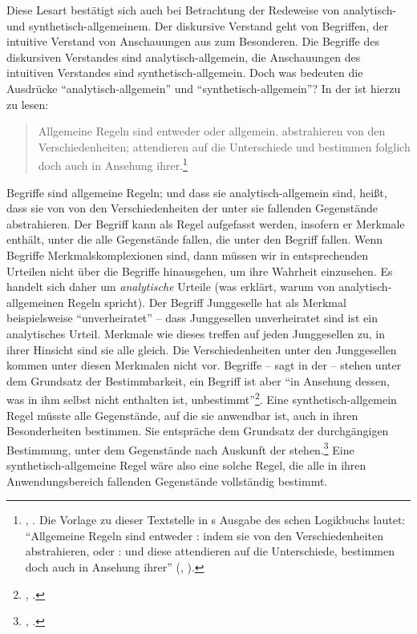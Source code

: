 Diese Lesart bestätigt sich auch  bei Betrachtung der Redeweise von analytisch-
und synthetisch-allgemeinem. Der diskursive Verstand geht von Begriffen, der
intuitive Verstand von Anschauungen aus zum Besonderen. Die Begriffe des
diskursiven Verstandes sind analytisch-allgemein, die Anschauungen des
intuitiven Verstandes sind synthetisch-allgemein. Doch was bedeuten die
Ausdrücke \enquote{ana\-ly\-tisch-all\-ge\-mein} und
\enquote{syn\-the\-tisch-all\-ge\-mein}? In der {\jaeschelogik} ist hierzu zu lesen:
\begin{quote}
Allgemeine Regeln sind entweder  oder 
allgemein.  abstrahieren von den Verschiedenheiten; 
attendieren auf die Unterschiede und bestimmen folglich doch auch in Ansehung
ihrer.\footnote{\cite[][\S~21]{Kant:ImmanuelKantsLogik1977},
\cite[][IX: 102.31--33]{Kant:GesammelteWerke1900ff.}. Die Vorlage zu dieser
Textstelle in s Ausgabe des
schen Logikbuchs lautet:
\enquote{Allgemeine Regeln sind entweder
: indem sie von den Verschiedenheiten
abstrahieren, oder : und diese attendieren
auf die Unterschiede, bestimmen doch auch in Ansehung ihrer}
\mkbibparens{\cite[][]{Kant:Reflexionen1900ff.},
\cite[][XVI: 651.5--8]{Kant:GesammelteWerke1900ff.}}.}
\end{quote}
Begriffe sind allgemeine Regeln; und dass sie analytisch-allgemein sind, heißt,
dass sie von von den Verschiedenheiten der unter sie fallenden Gegenstände
abstrahieren. Der Begriff kann als Regel aufgefasst
werden, insofern er Merkmale enthält, unter die alle Gegenstände fallen, die
unter den Begriff fallen. Wenn Begriffe Merkmalskomplexionen sind, dann müssen wir
in entsprechenden Urteilen nicht über die Begriffe hinausgehen, um ihre Wahrheit
einzusehen. Es handelt sich daher um \emph{analytische} Urteile (was erklärt,
warum  von analytisch-allgemeinen Regeln spricht). Der
Begriff Junggeselle hat als Merkmal beispielsweise \enquote{unverheiratet} --
dass Junggesellen unverheiratet sind ist ein analytisches Urteil. Merkmale wie
dieses treffen auf jeden Junggesellen zu, in ihrer Hinsicht sind sie alle
gleich. Die Verschiedenheiten unter den Junggesellen kommen unter diesen
Merkmalen nicht vor. Begriffe -- sagt  in der  -- stehen unter dem Grundsatz der Bestimmbarkeit, ein
Begriff ist aber \enquote{in Ansehung dessen, was in ihm selbst nicht enthalten
ist, unbestimmt}\footnote{\cite[][B 599]{Kant:KritikderreinenVernunft2003},
\cite[][III: 385.18--19]{Kant:GesammelteWerke1900ff.}.}. Eine
synthetisch-allgemein Regel müsste alle Gegenstände, auf die sie anwendbar ist,
auch in ihren Besonderheiten bestimmen. Sie entspräche dem Grundsatz der durchgängigen
Bestimmung, unter dem Gegenstände nach Auskunft der  stehen.\footnote{\cite[Vgl.][B 599]{Kant:KritikderreinenVernunft2003},
\cite[][III: 385.25--28]{Kant:GesammelteWerke1900ff.}.} Eine
synthetisch-allgemeine Regel wäre also eine solche Regel, die alle in ihren
Anwendungsbereich fallenden Gegenstände vollständig bestimmt.

